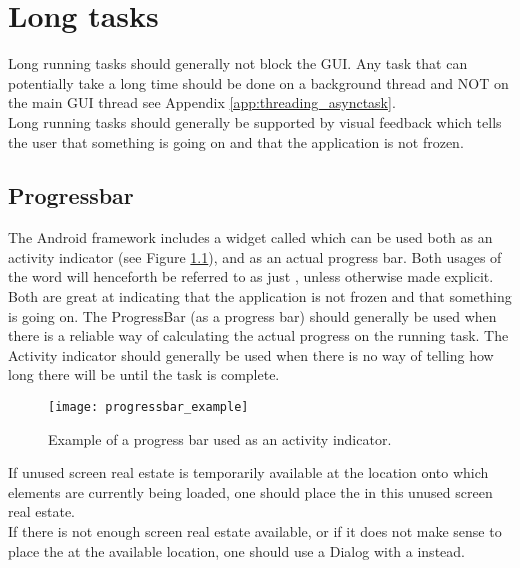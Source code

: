 
\chapter{Long tasks}
Long running tasks should generally not block the GUI. Any task that can potentially take a long time should be done on a background thread and NOT on the main GUI thread see Appendix \ref{app:threading_asynctask}. \\

Long running tasks should generally be supported by visual feedback which tells the user that something is going on and that the application is not frozen. 

\section{Progressbar}
The Android framework includes a widget called  which can be used both as an activity indicator (see Figure \ref{fig:activity_indicator_in_dialog}), and as an actual progress bar. Both usages of the word will henceforth be referred to as just , unless otherwise made explicit. Both are great at indicating that the application is not frozen and that something is going on. The ProgressBar (as a progress bar) should generally be used when there is a reliable way of calculating the actual progress on the running task. The Activity indicator should generally be used when there is no way of telling how long there will be until the task is complete. \\

\begin{figure}[!htbp]
  \centering
    \texttt{[image: progressbar\_example]}
    \caption{Example of a progress bar used as an activity indicator.}
    \label{fig:activity_indicator_in_dialog}
\end{figure}

\noindent If unused screen real estate is temporarily available at the location onto which elements are currently being loaded, one should place the  in this unused screen real estate.\\

\noindent If there is not enough screen real estate available, or if it does not make sense to place the  at the available location, one should use a Dialog with a  instead.
